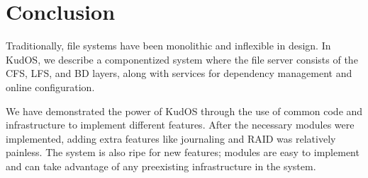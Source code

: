 \section{Conclusion}
\label{sec:conclusion}

Traditionally, file systems have been monolithic and inflexible in design. In
KudOS, we describe a componentized system where the file server consists of the
CFS, LFS, and BD layers, along with services for dependency management and
online configuration. 

We have demonstrated the power of KudOS through the use of common code and
infrastructure to implement different features. After the necessary modules were
implemented, adding extra features like journaling and RAID was relatively
painless. The system is also ripe for new features; modules are easy to
implement and can take advantage of any preexisting infrastructure in the
system.
